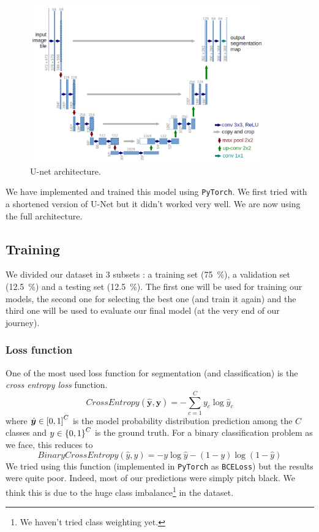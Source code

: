 \documentclass[a4paper, 12pt]{article}
\begin{document}
    \begin{figure}[H]
        \centering
        \includegraphics[width=0.9\textwidth]{resources/png/unet.png}
        \caption{U-net architecture. \cite{ronneberger2015u}}
    \end{figure}
    
    We have implemented and trained this model using \texttt{PyTorch}. We first tried with a shortened version of U-Net but it didn't worked very well. We are now using the full architecture.
    
    \subsection{Training}
    
    We divided our dataset in 3 subsets : a training set (\SI{75}{\percent}), a validation set (\SI{12.5}{\percent}) and a testing set (\SI{12.5}{\percent}). The first one will be used for training our models, the second one for selecting the best one (and train it again) and the third one will be used to evaluate our final model (at the very end of our journey).
    
    \subsubsection{Loss function}
    
    One of the most used loss function for segmentation (and classification) is the \emph{cross entropy loss} function.
    \begin{equation*}
        CrossEntropy(\hat{\bm{y}}, \bm{y}) = - \sum_{c=1}^C y_c \log \hat{y}_c
    \end{equation*}
    where $\hat{\bm{y}} \in \left[0, 1\right]^C$ is the model probability distribution prediction among the $C$ classes and $y \in \left\{0, 1\right\}^C$ is the ground truth. For a binary classification problem as we face, this reduces to
    \begin{equation*}
        BinaryCrossEntropy(\hat{y}, y) = - y \log \hat{y} - (1 - y) \log (1 - \hat{y})
    \end{equation*}
    We tried using this function (implemented in \texttt{PyTorch} as \texttt{BCELoss}) but the results were quite poor. Indeed, most of our predictions were simply pitch black. We think this is due to the huge class imbalance\footnote{We haven't tried class weighting yet.} in the dataset.
    
\end{document}
